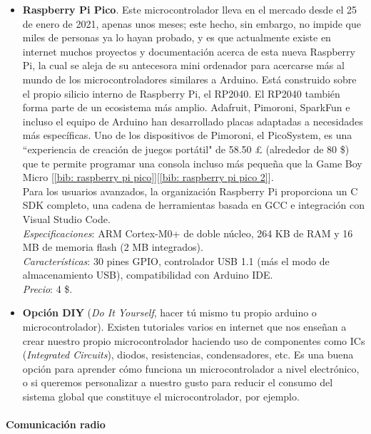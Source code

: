 \documentclass[12pt]{article}
\newcommand{\subsubsubsection}[1]{\paragraph{#1}\mbox{}\\}
\begin{document}
\begin{itemize}
		\item \textbf{Raspberry Pi Pico}. Este microcontrolador lleva en el mercado desde el 25 de enero de 2021, apenas unos meses; este hecho, sin embargo, no impide que miles de personas ya lo hayan probado, y es que actualmente existe en internet muchos proyectos y documentación acerca de esta nueva Raspberry Pi, la cual se aleja de su antecesora mini ordenador para acercarse más al mundo de los microcontroladores similares a Arduino. Está construido sobre el propio silicio interno de Raspberry Pi, el RP2040. El RP2040 también forma parte de un ecosistema más amplio. Adafruit, Pimoroni, SparkFun e incluso el equipo de Arduino han desarrollado placas adaptadas a necesidades más específicas. Uno de los dispositivos de Pimoroni, el PicoSystem, es una ``experiencia de creación de juegos portátil" de 58.50 £ (alrededor de 80 \$) que te permite programar una consola incluso más pequeña que la Game Boy Micro [\ref{bib: raspberry pi pico}][\ref{bib: raspberry pi pico 2}].\\
		
		Para los usuarios avanzados, la organización Raspberry Pi proporciona un C SDK completo, una cadena de herramientas basada en GCC e integración con Visual Studio Code. \\
		
		\textit{Especificaciones}: ARM Cortex-M0+ de doble núcleo, 264 KB de RAM y 16 MB de memoria flash (2 MB integrados). \\
		
		\textit{Características}: 30 pines GPIO, controlador USB 1.1 (más el modo de almacenamiento USB), compatibilidad con Arduino IDE.\\
		
		\textit{Precio}: 4 \$.\\
		
		\item \textbf{Opción DIY} (\textit{Do It Yourself}, hacer tú mismo tu propio arduino o microcontrolador). Existen tutoriales varios en internet que nos enseñan a crear nuestro propio microcontrolador haciendo uso de componentes como ICs (\textit{Integrated Circuits}), diodos, resistencias, condensadores, etc. Es una buena opción para aprender cómo funciona un microcontrolador a nivel electrónico, o si queremos personalizar a nuestro gusto para reducir el consumo del sistema global que constituye el microcontrolador, por ejemplo.\\

	\end{itemize}
	\subsubsubsection{Comunicación radio}
	
\end{document}
